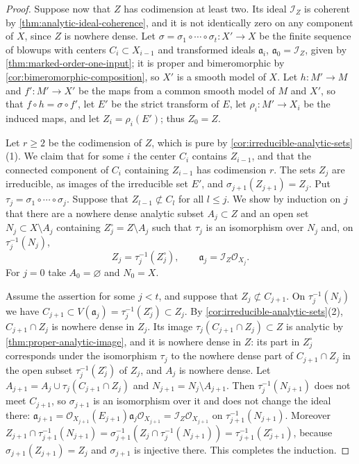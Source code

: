 \begin{proof}
Suppose now that $Z$ has codimension at least two. Its ideal $\mathcal I_Z$ is coherent by \cref{thm:analytic-ideal-coherence}, and it is not identically zero on any component of $X$, since $Z$ is nowhere dense. Let $\sigma=\sigma_1\circ\cdots\circ\sigma_t\colon X'\to X$ be the finite sequence of blowups with centers $C_i\subset X_{i-1}$ and transformed ideals $\mathfrak a_i$, $\mathfrak a_0=\mathcal I_Z$, given by \cref{thm:marked-order-one-input}; it is proper and bimeromorphic by \cref{cor:bimeromorphic-composition}, so $X'$ is a smooth model of $X$. Let $h\colon M'\to M$ and $f'\colon M'\to X'$ be the maps from a common smooth model of $M$ and $X'$, so that $f\circ h=\sigma\circ f'$, let $E'$ be the strict transform of $E$, let $\rho_i\colon M'\to X_i$ be the induced maps, and let $Z_i=\rho_i(E')$; thus $Z_0=Z$.

Let $r\geq2$ be the codimension of $Z$, which is pure by \cref{cor:irreducible-analytic-sets}(1). We claim that for some $i$ the center $C_i$ contains $Z_{i-1}$, and that the connected component of $C_i$ containing $Z_{i-1}$ has codimension $r$. The sets $Z_j$ are irreducible, as images of the irreducible set $E'$, and $\sigma_{j+1}(Z_{j+1})=Z_j$. Put $\tau_j=\sigma_1\circ\cdots\circ\sigma_j$. Suppose that $Z_{l-1}\not\subset C_l$ for all $l\leq j$. We show by induction on $j$ that there are a nowhere dense analytic subset $A_j\subset Z$ and an open set $N_j\subset X\setminus A_j$ containing $Z^\circ_j=Z\setminus A_j$ such that $\tau_j$ is an isomorphism over $N_j$ and, on $\tau_j^{-1}(N_j)$,
\[
 Z_j=\tau_j^{-1}(Z^\circ_j),\qquad\mathfrak a_j=\mathcal I_Z\mathcal O_{X_j}.
\]
For $j=0$ take $A_0=\varnothing$ and $N_0=X$.

Assume the assertion for some $j<t$, and suppose that $Z_j\not\subset C_{j+1}$. On $\tau_j^{-1}(N_j)$ we have $C_{j+1}\subset V(\mathfrak a_j)=\tau_j^{-1}(Z^\circ_j)\subset Z_j$. By \cref{cor:irreducible-analytic-sets}(2), $C_{j+1}\cap Z_j$ is nowhere dense in $Z_j$. Its image $\tau_j(C_{j+1}\cap Z_j)\subset Z$ is analytic by \cref{thm:proper-analytic-image}, and it is nowhere dense in $Z$: its part in $Z^\circ_j$ corresponds under the isomorphism $\tau_j$ to the nowhere dense part of $C_{j+1}\cap Z_j$ in the open subset $\tau_j^{-1}(Z^\circ_j)$ of $Z_j$, and $A_j$ is nowhere dense. Let $A_{j+1}=A_j\cup\tau_j(C_{j+1}\cap Z_j)$ and $N_{j+1}=N_j\setminus A_{j+1}$. Then $\tau_j^{-1}(N_{j+1})$ does not meet $C_{j+1}$, so $\sigma_{j+1}$ is an isomorphism over it and does not change the ideal there: $\mathfrak a_{j+1}=\mathcal O_{X_{j+1}}(E_{j+1})\mathfrak a_j\mathcal O_{X_{j+1}}=\mathcal I_Z\mathcal O_{X_{j+1}}$ on $\tau_{j+1}^{-1}(N_{j+1})$. Moreover $Z_{j+1}\cap\tau_{j+1}^{-1}(N_{j+1})=\sigma_{j+1}^{-1}(Z_j\cap\tau_j^{-1}(N_{j+1}))=\tau_{j+1}^{-1}(Z^\circ_{j+1})$, because $\sigma_{j+1}(Z_{j+1})=Z_j$ and $\sigma_{j+1}$ is injective there. This completes the induction.


\end{proof}
